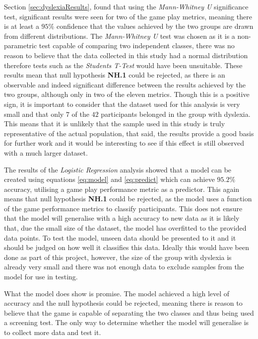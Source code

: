 \documentclass[journal]{IEEEtran}
\begin{document}
Section \ref{sec:dyslexiaResults}, found that using the \emph{Mann-Whitney U} significance test, significant results were seen for two of the game play metrics, meaning there is at least a $95\%$ confidence that the values achieved by the two groups are drawn from different distributions.
The \emph{Mann-Whitney U} test was chosen as it is a non-parametric test capable of comparing two independent classes, there was no reason to believe that the data collected in this study had a normal distribution therefore tests such as the \emph{Students T-Test} would have been unsuitable. 
These results mean that null hypothesis \textbf{NH.1} could be rejected, as there is an observable and indeed significant difference between the results achieved by the two groups, although only in two of the eleven metrics. 
Though this is a positive sign, it is important to consider that the dataset used for this analysis is very small and that only $7$ of the $42$ participants belonged in the group with dyslexia. This means that it is unlikely that the sample used in this study is truly representative of the actual population, that said, the results provide a good basis for further work and it would be interesting to see if this effect is still observed with a much larger dataset.


The results of the \emph{Logistic Regression} analysis showed that a model can be created using equations \ref{eq:model} and \ref{eq:predict} which can achieve $95.2\%$ accuracy, utilising a game play performance metric as a predictor. This again means that null hypothesis \textbf{NH.1} could be rejected, as the model uses a function of the game performance metrics to classify participants.
This does not ensure that the model will generalise with a high accuracy to new data as it is likely that, due the small size of the dataset, the model has overfitted to the provided data points. To test the model, unseen data should be presented to it and it should be judged on how well it classifies this data. Ideally this would have been done as part of this project, however, the size of the group with dyslexia is already very small and there was not enough data to exclude samples from the model for use in testing.

What the model does show is promise. The model achieved a high level of accuracy and the null hypothesis could be rejected, meaning there is reason to believe that the game is capable of separating the two classes and thus being used a screening test. The only way to determine whether the model will generalise is to collect more data and test it.
 
\end{document}
